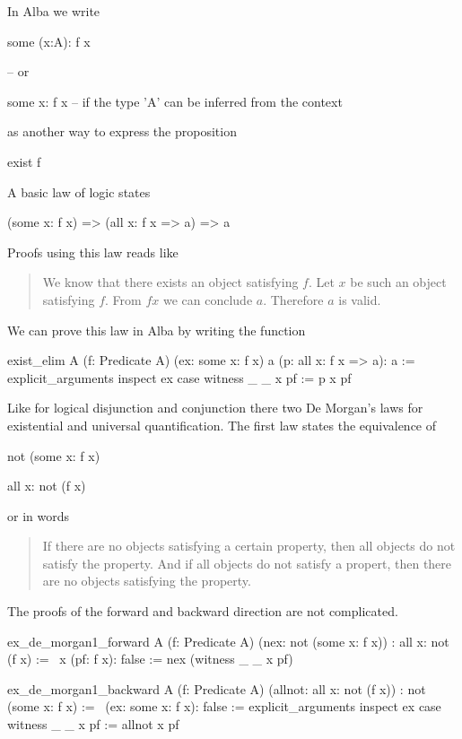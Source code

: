 In Alba we write
%
\begin{alba}
  some (x:A): f x

  -- or

  some x: f x   -- if the type 'A' can be inferred from the context
\end{alba}
%
as another way to express the proposition
%
\begin{alba}
  exist f
\end{alba}

A basic law of logic states
%
\begin{alba}
  (some x: f x) => (all x: f x => a) => a
\end{alba}
%
Proofs using this law reads like
\begin{quote}
  We know that there exists an object satisfying $f$. Let $x$ be such an
  object satisfying $f$. From $ f x$ we can conclude $a$. Therefore $a$ is
  valid.
\end{quote}

We can prove this law in Alba by writing the function
\begin{alba}
  exist_elim
    A (f: Predicate A) (ex: some x: f x)
    a (p: all x: f x => a): a :=
      explicit_arguments
        inspect ex case
          witness _ _ x pf :=
            p x pf
\end{alba}


Like for logical disjunction and conjunction there two De Morgan's laws for
existential and universal quantification. The first law states the equivalence
of
\begin{alba}
  not (some x: f x)

  all x: not (f x)
\end{alba}
or in words
\begin{quote}
  If there are no objects satisfying a certain property, then all objects do
  not satisfy the property. And if all objects do not satisfy a propert, then
  there are no objects satisfying the property.
\end{quote}

The proofs of the forward and backward direction are not complicated.

\begin{alba}
   ex_de_morgan1_forward
     A (f: Predicate A)
     (nex: not (some x: f x))
     : all x: not (f x) :=
       \ x (pf: f x): false :=
          nex (witness _ _ x pf)
\end{alba}


\begin{alba}
  ex_de_morgan1_backward
     A (f: Predicate A)
     (allnot: all x: not (f x))
     : not (some x: f x) :=
       \ (ex: some x: f x): false :=
          explicit_arguments
            inspect ex case
              witness _ _ x pf :=
                allnot x pf
\end{alba}

